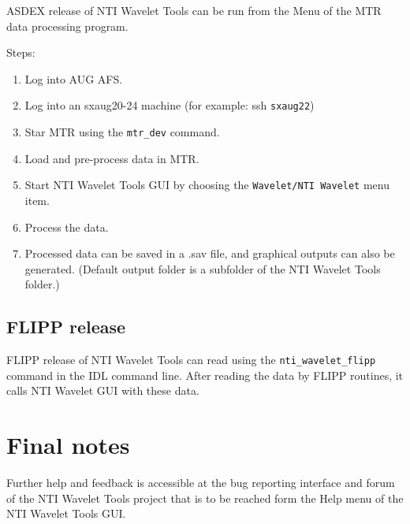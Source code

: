 \documentclass[12pt]{article}
\begin{document}
ASDEX release of NTI Wavelet Tools can be run from the Menu of the MTR data processing program.

Steps:
\begin{enumerate}
	\item Log into AUG AFS.
	\item Log into an sxaug20-24 machine (for example: ssh \verb|sxaug22|)
	\item Star MTR using the \verb|mtr_dev| command.
	\item Load and pre-process data in MTR.
	\item Start NTI Wavelet Tools GUI by choosing the \verb|Wavelet/NTI Wavelet|  menu item.
	\item Process the data.
	\item Processed data can be saved in a .sav file, and graphical outputs can also be generated. (Default output folder is a subfolder of the NTI Wavelet Tools folder.)
\end{enumerate}

\subsection{FLIPP release}

FLIPP release of NTI Wavelet Tools can read using the \verb|nti_wavelet_flipp| command in the IDL command line. After reading the data by FLIPP routines, it calls NTI Wavelet GUI with these data.

\section{Final notes}

Further help and feedback is accessible at the bug reporting interface and forum of the NTI Wavelet Tools project that is to be reached form the Help menu of the NTI Wavelet Tools GUI.

% 
% 
\end{document}

